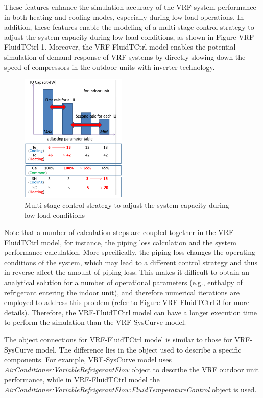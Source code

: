 These features enhance the simulation accuracy of the VRF system performance in both heating and cooling modes, especially during low load operations. In addition, these features enable the modeling of a multi-stage control strategy to adjust the system capacity during low load conditions, as shown in Figure VRF-FluidTCtrl-1. Moreover, the VRF-FluidTCtrl model enables the potential simulation of demand response of VRF systems by directly slowing down the speed of compressors in the outdoor units with inverter technology.

\begin{figure}[hbtp] %
\centering
\includegraphics[width=0.45\textwidth, height=0.45\textheight, keepaspectratio=true]{media/VRF-FluidTCtrl-1a.png}
\caption{Multi-stage control strategy to adjust the system capacity during low load conditions \label{fig:multi-stage-control-strategy-to-adjust-the-system-capacity-during-low-load-conditions}}
\end{figure}

Note that a number of calculation steps are coupled together in the VRF-FluidTCtrl model, for instance, the piping loss calculation and the system performance calculation. More specifically, the piping loss changes the operating conditions of the system, which may lead to a different control strategy and thus in reverse affect the amount of piping loss. This makes it difficult to obtain an analytical solution for a number of operational parameters (e.g., enthalpy of refrigerant entering the indoor unit), and therefore numerical iterations are employed to address this problem (refer to Figure VRF-FluidTCtrl-3 for more details). Therefore, the VRF-FluidTCtrl model can have a longer execution time to perform the simulation than the VRF-SysCurve model.

The object connections for VRF-FluidTCtrl model is similar to those for VRF-SysCurve model. The difference lies in the object used to describe a specific components. For example, VRF-SysCurve model uses \emph{AirConditioner:VariableRefrigerantFlow} object to describe the VRF outdoor unit performance, while in VRF-FluidTCtrl model the \emph{AirConditioner:VariableRefrigerantFlow:FluidTemperatureControl} object is used.

